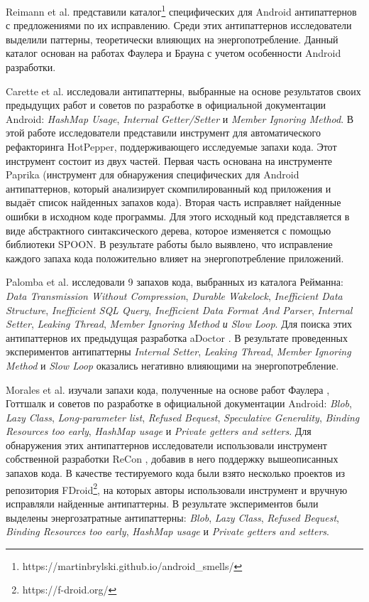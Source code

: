 Reimann et al. \cite{reimann2014tool} представили каталог\footnote{https://martinbrylski.github.io/android\_smells/} специфических для Android антипаттернов с предложениями по их исправлению. Среди этих антипаттернов исследователи выделили паттерны, теоретически влияющих на энергопотребление. Данный каталог основан на работах Фаулера и Брауна с учетом особенности Android разработки. 

Carette et al. \cite{carette2017investigating} исследовали антипаттерны, выбранные на основе результатов своих предыдущих работ и советов по разработке в официальной документации Android: \emph{HashMap Usage}, \emph{Internal Getter/Setter} и \emph{Member Ignoring Method}. В этой работе исследователи представили инструмент для автоматического рефакторинга HotPepper, поддерживающего исследуемые запахи кода. Этот инструмент состоит из двух частей. Первая часть основана на инструменте Paprika (инструмент для обнаружения специфических для Android антипаттернов, который анализирует скомпилированный код приложения и выдаёт список найденных запахов кода). Вторая часть исправляет найденные ошибки в исходном коде программы. Для этого исходный код представляется в виде абстрактного синтаксического дерева, которое изменяется с помощью библиотеки SPOON. В результате работы было выявлено, что исправление каждого запаха кода положительно влияет на энергопотребление приложений.

Palomba et al. \cite{palomba2019impact} исследовали 9 запахов кода, выбранных из каталога Рейманна: \emph{Data Transmission Without Compression}, \emph{Durable Wakelock}, \emph{Inefficient Data Structure}, \emph{Inefficient SQL Query}, \emph{Inefficient Data Format And Parser}, \emph{Internal Setter}, \emph{Leaking Thread}, \emph{Member Ignoring Method и Slow Loop}. Для поиска этих антипаттернов их предыдущая разработка aDoctor \cite{palomba2017lightweight}. В результате проведенных экспериментов антипаттерны \emph{Internal Setter}, \emph{Leaking Thread}, \emph{Member Ignoring Method} и \emph{Slow Loop} оказались негативно влияющими на энергопотребление.

Morales et al. \cite{morales2016anti} изучали запахи кода, полученные на основе работ Фаулера \cite{fowler2018refactoring}, Готтшалк \cite{gottschalk2016refactorings} и советов по разработке в официальной документации Android: \emph{Blob}, \emph{Lazy Class}, \emph{Long-parameter list}, \emph{Refused Bequest}, \emph{Speculative Generality}, \emph{Binding Resources too early}, \emph{HashMap usage} и \emph{Private getters and setters}. Для обнаружения этих антипаттернов исследователи использовали инструмент собственной разработки ReCon \cite{morales2017use}, добавив в него поддержку вышеописанных запахов кода. В качестве тестируемого кода были взято несколько проектов из репозитория FDroid\footnote{https://f-droid.org/}, на которых авторы использовали инструмент и вручную исправляли найденные антипаттерны. В результате экспериментов были выделены энергозатратные антипаттерны: \emph{Blob}, \emph{Lazy Class},  \emph{Refused Bequest}, \emph{Binding Resources too early}, \emph{HashMap usage} и \emph{Private getters and setters}.

